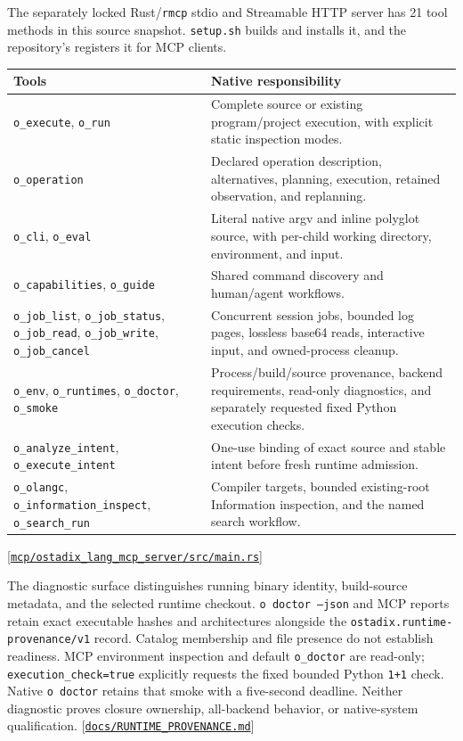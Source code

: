 \documentclass[11pt,oneside]{article}
\newcommand{\src}[1]{\textcolor{OSlate}{\scriptsize[\href{https://github.com/lostadi/OSTADIX/blob/c0b02c326b2329a95ba52447c7180bc93957cd57/#1}{\nolinkurl{#1}}]}\allowbreak}
\begin{document}
The separately locked Rust/\texttt{rmcp} stdio and Streamable HTTP server has 21 tool methods in
this source snapshot. \texttt{setup.sh} builds and installs it, and the
repository's  registers it for MCP clients.
\begin{longtable}{P{0.39\textwidth} P{0.53\textwidth}}
\toprule
\textbf{Tools} & \textbf{Native responsibility} \\
\midrule
\endhead
\texttt{o\_execute}, \texttt{o\_run} & Complete source or existing
program/project execution, with explicit static inspection modes. \\
\texttt{o\_operation} & Declared operation description, alternatives,
planning, execution, retained observation, and replanning. \\
\texttt{o\_cli}, \texttt{o\_eval} & Literal native argv and inline polyglot
source, with per-child working directory, environment, and input. \\
\texttt{o\_capabilities}, \texttt{o\_guide} & Shared command discovery and
human/agent workflows. \\
\texttt{o\_job\_list}, \texttt{o\_job\_status},
\texttt{o\_job\_read}, \texttt{o\_job\_write},
\texttt{o\_job\_cancel} & Concurrent session jobs, bounded log pages,
lossless base64 reads, interactive input, and owned-process cleanup. \\
\texttt{o\_env}, \texttt{o\_runtimes}, \texttt{o\_doctor},
\texttt{o\_smoke} & Process/build/source provenance, backend requirements,
read-only diagnostics, and separately requested fixed Python execution checks. \\
\texttt{o\_analyze\_intent}, \texttt{o\_execute\_intent} & One-use binding
of exact source and stable intent before fresh runtime admission. \\
\texttt{o\_olangc}, \texttt{o\_information\_inspect},
\texttt{o\_search\_run} & Compiler targets, bounded existing-root
Information inspection, and the named search workflow. \\
\bottomrule
\end{longtable}
\src{mcp/ostadix_lang_mcp_server/src/main.rs}

The diagnostic surface distinguishes running binary identity, build-source
metadata, and the selected runtime checkout. \texttt{o doctor --json} and MCP
reports retain exact executable hashes and architectures alongside the
\texttt{ostadix.runtime-provenance/v1} record. Catalog membership and file
presence do not establish readiness. MCP environment inspection and default
\texttt{o\_doctor} are read-only; \texttt{execution\_check=true} explicitly
requests the fixed bounded Python \texttt{1+1} check. Native \texttt{o doctor}
retains that smoke with a five-second deadline. Neither diagnostic proves
closure ownership, all-backend behavior, or native-system qualification.
\src{docs/RUNTIME_PROVENANCE.md}
\end{document}
